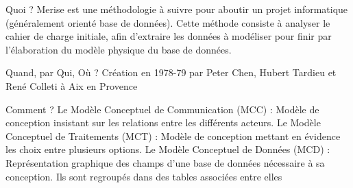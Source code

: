 \documentclass{beamer}
\begin{document}
    \begin{frame}
        Quoi ?
    \newline
    \newline
        Merise est une méthodologie à suivre pour aboutir un projet informatique (généralement orienté base de données).
    \newline
    \newline
        Cette méthode consiste à analyser le cahier de charge initiale,
        afin d'extraire les données à modéliser pour finir par l'élaboration du modèle physique du base de données.
    \end{frame}

    \begin{frame}
        Quand, par Qui, Où ?
        \newline
        \newline
        Création en 1978-79 par Peter Chen, Hubert Tardieu et René Colleti à Aix en Provence
    \end{frame}

    \begin{frame}

        Comment ?
    \newline
    \newline
        Le Modèle Conceptuel de Communication (MCC) :
    \newline
        Modèle de conception insistant sur les relations entre les différents acteurs.
    \newline
    \newline
        Le Modèle Conceptuel de Traitements (MCT) :
    \newline
        Modèle de conception mettant en évidence les choix entre plusieurs options.
    \newline
    \newline
        Le Modèle Conceptuel de Données (MCD) :
    \newline
        Représentation graphique des champs d'une base de données nécessaire à sa conception.
    \newline
        Ils sont regroupés dans des tables associées entre elles

    \end{frame}
\end{document}
